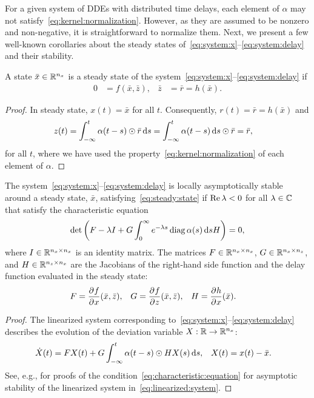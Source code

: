 %
For a given system of DDEs with distributed time delays, each element of $\alpha$ may not satisfy~\eqref{eq:kernel:normalization}. However, as they are assumed to be nonzero and non-negative, it is straightforward to normalize them. Next, we present a few well-known corollaries about the steady states of~\eqref{eq:system:x}--\eqref{eq:system:delay} and their stability.
%
\begin{corollary}\label{thm:steady:state}
	A state $\bar x \in \mathbb{R}^{n_x}$ is a steady state of the system~\eqref{eq:system:x}--\eqref{eq:system:delay} if
	\begin{align}\label{eq:steady:state}
		0 &= f(\bar x, \bar z), &
		\bar z &= \bar r = h(\bar x).
	\end{align}
\end{corollary}

\begin{proof}
	In steady state, $x(t) = \bar x$ for all $t$. Consequently, $r(t) = \bar r = h(\bar x)$ and
	\begin{align}
		z(t)
		&= \int_{-\infty}^t \alpha(t - s) \odot \bar r \,\mathrm{d} s
		 = \int_{-\infty}^t \alpha(t - s) \,\mathrm{d} s \odot \bar r
		 = \bar r,
	\end{align}
	for all $t$, where we have used the property~\eqref{eq:kernel:normalization} of each element of $\alpha$.
\end{proof}
%
\begin{corollary}\label{thm:stability}
	The system~\eqref{eq:system:x}--\eqref{eq:system:delay} is locally asymptotically stable around a steady state, $\bar x$, satisfying~\eqref{eq:steady:state} if $\operatorname{Re} \lambda < 0$ for all $\lambda \in \mathbb C$ that satisfy the characteristic equation
	\begin{align}\label{eq:characteristic:equation}
		\det\left(F - \lambda I + G \int_0^\infty e^{-\lambda s} \operatorname{diag} \alpha(s) \,\mathrm{d} s H\right) = 0,
	\end{align}
	where $I \in \mathbb{R}^{n_x \times n_x}$ is an identity matrix.
	The matrices $F \in \mathbb{R}^{n_x \times n_x}$, $G \in \mathbb{R}^{n_x \times n_z}$, and $H \in \mathbb{R}^{n_z \times n_x}$ are the Jacobians of the right-hand side function and the delay function evaluated in the steady state:
	\begin{align}\label{eq:jacobians}
		F &= \frac{\partial^{}{f}}{\partial^{}{x}}(\bar x, \bar z), &
		G &= \frac{\partial^{}{f}}{\partial^{}{z}}(\bar x, \bar z), &
		H &= \frac{\partial^{}{h}}{\partial^{}{x}}(\bar x).
	\end{align}
\end{corollary}

\begin{proof}
	The linearized system corresponding to~\eqref{eq:system:x}--\eqref{eq:system:delay} describes the evolution of the deviation variable $X: \mathbb{R} \rightarrow \mathbb{R}^{n_x}$:
	\begin{align}\label{eq:linearized:system}
		\dot X(t) &= F X(t) + G \int_{-\infty}^t \alpha(t - s) \odot H X(s) \,\mathrm{d} s, &
		X(t) &= x(t) - \bar x.
	\end{align}
	See, e.g., \cite{Cushing:1975, Cushing:1977, Miller:1972} for proofs of the condition~\eqref{eq:characteristic:equation} for asymptotic stability of the linearized system in~\eqref{eq:linearized:system}.
\end{proof}

